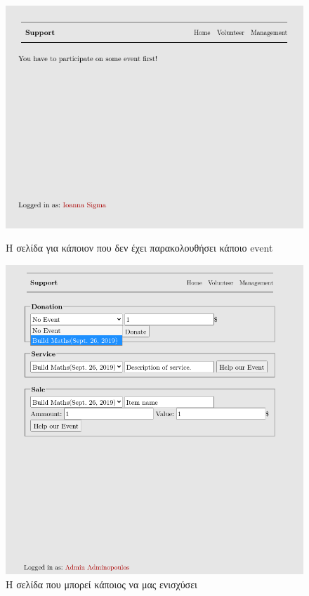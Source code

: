 \documentclass[manuscript,screen,review]{acmart}
\newcommand{\en}[1]{\foreignlanguage{english}{#1}}
\begin{document}
\begin{figure}[H]
\centering
\centering
    \includegraphics[width=.5\textwidth]{./images/support.png}
    \caption{Η σελίδα για κάποιον που δεν έχει παρακολουθήσει κάποιο \en{event}}
    \includegraphics[width=.5\textwidth]{./images/support_example.png}
    \caption{Η σελίδα που μπορεί κάποιος να μας ενισχύσει}
    
   
\end{figure}
\end{document}

